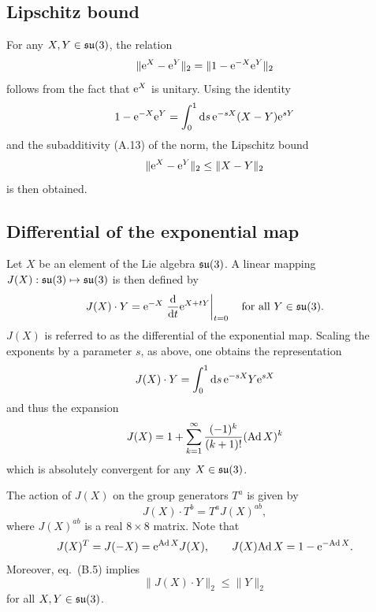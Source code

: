 \subsection{Lipschitz bound}

For any $X,Y\in\mathfrak{su}(3)$, the relation
\begin{equation}
  \|\mathrm{e}^X-\mathrm{e}^Y\|_2=
  \|1-\mathrm{e}^{-X}\mathrm{e}^Y\|_2
\end{equation}
follows from the fact that $\mathrm{e}^X$ is unitary.
Using the identity
\begin{equation}
  1-\mathrm{e}^{-X}\mathrm{e}^Y=
  \int_0^1\mathrm{d} s\,\mathrm{e}^{-sX}(X-Y)\mathrm{e}^{sY}
\end{equation}
and the subadditivity (A.13) of the norm,
the Lipschitz bound
\begin{equation}
  \|\mathrm{e}^X-\mathrm{e}^Y\|_2\leq\|X-Y\|_2
\end{equation}
is then obtained.


\subsection{Differential of the exponential map}

Let $X$ be an element of the Lie algebra $\mathfrak{su}(3)$.
A linear mapping $J(X):\mathfrak{su}(3)\mapsto\mathfrak{su}(3)$ is then defined by
\begin{equation}
  J(X)\cdot Y=\mathrm{e}^{-X}\left.{\mathrm{d}\over\mathrm{d} t}\mathrm{e}^{X+tY}\right|_{t=0}
  \quad\text{for all $Y\in\mathfrak{su}(3)$.}
\end{equation}
$J(X)$ is referred to as the differential of the exponential map.
Scaling the expo\-nents by a parameter $s$, as above,
one obtains the representation
\begin{equation}
  J(X)\cdot Y=
  \int_0^1\mathrm{d} s\,\mathrm{e}^{-sX}Y\mathrm{e}^{sX}
\end{equation}
and thus the expansion
\begin{equation}
  J(X)=1+\sum_{k=1}^{\infty}{(-1)^k\over(k+1)!}(\mathrm{Ad}\, X)^k
\end{equation}
which is absolutely convergent for any $X\in\mathfrak{su}(3)$.

The action of $J(X)$ on the group generators $T^a$
is given by
\begin{equation}
  J(X)\cdot T^b=T^aJ(X)^{ab},
\end{equation}
where $J(X)^{ab}$ is a real $8\times8$ matrix.
Note that
\begin{equation}
  J(X)^T=J(-X)=\mathrm{e}^{\mathrm{Ad}\, X}J(X),
  \qquad
  J(X)\mathrm{Ad}\, X=1-\mathrm{e}^{-\mathrm{Ad}\, X}.
\end{equation}
Moreover, eq.~(B.5) implies
\begin{equation}
  \|J(X)\cdot Y\|_2\leq\|Y\|_2
\end{equation}
for all $X,Y\in\mathfrak{su}(3)$.

